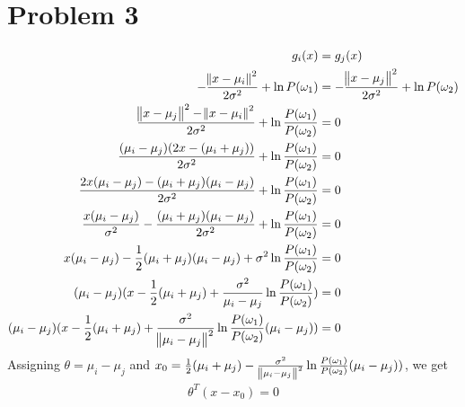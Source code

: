 \documentclass[a4paper, 10pt, twoside]{article}
\begin{document}
\section*{Problem 3}
\begin{align*}
    g_i(x) &= g_j(x) \\
    -\frac{\norm{x-\mu_i}^2}{2\sigma^2} + \ln P(\omega_1) &= -\frac{\norm{x-\mu_j}^2}{2\sigma^2} + \ln P(\omega_2) \\
    \frac{\norm{x-\mu_j}^2 - \norm{x-\mu_i}^2}{2\sigma^2} + \ln \frac{P(\omega_1)}{P(\omega_2)} &= 0 \\
    \frac{(\mu_i-\mu_j)(2x-(\mu_i+\mu_j))}{2\sigma^2} + \ln \frac{P(\omega_1)}{P(\omega_2)} &= 0 \\
    \frac{2x(\mu_i-\mu_j)-(\mu_i+\mu_j)(\mu_i-\mu_j)}{2\sigma^2} + \ln \frac{P(\omega_1)}{P(\omega_2)} &= 0 \\
    \frac{x(\mu_i-\mu_j)}{\sigma^2}-\frac{(\mu_i+\mu_j)(\mu_i-\mu_j)}{2\sigma^2} + \ln \frac{P(\omega_1)}{P(\omega_2)} &= 0 \\
    x(\mu_i-\mu_j)-\frac{1}{2}(\mu_i+\mu_j)(\mu_i-\mu_j) + \sigma^2 \ln \frac{P(\omega_1)}{P(\omega_2)} &= 0 \\
    (\mu_i-\mu_j)(x-\frac{1}{2}(\mu_i+\mu_j) + \frac{\sigma^2}{\mu_i-\mu_j} \ln \frac{P(\omega_1)}{P(\omega_2)}) &= 0 \\
    (\mu_i-\mu_j)(x-\frac{1}{2}(\mu_i+\mu_j) + \frac{\sigma^2}{\norm{\mu_i-\mu_j}^2} \ln \frac{P(\omega_1)}{P(\omega_2)}(\mu_i-\mu_j)) &= 0 \\
\end{align*}
Assigning $\theta = \mu_i-\mu_j$ and $x_0 = \frac{1}{2}(\mu_i+\mu_j) - \frac{\sigma^2}{\norm{\mu_i-\mu_j}^2} \ln \frac{P(\omega_1)}{P(\omega_2)}(\mu_i-\mu_j))$, we get
\begin{align*}
    \theta^T(x-x_0) = 0
\end{align*}
\end{document}
